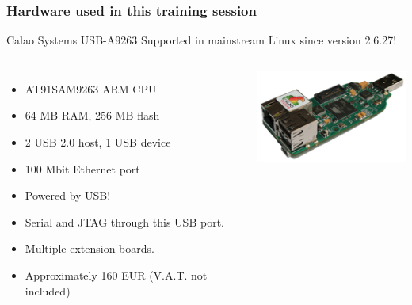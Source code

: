 \begin{frame}
\frametitle{Hardware used in this training session}
  Calao Systems USB-A9263
  Supported in mainstream Linux since version 2.6.27!
  \begin{columns}
    \begin{itemize}
      \item AT91SAM9263 ARM CPU
      \item 64 MB RAM, 256 MB flash
      \item 2 USB 2.0 host, 1 USB device
      \item 100 Mbit Ethernet port
      \item Powered by USB!
      \item Serial and JTAG through this USB port.
      \item Multiple extension boards.
      \item Approximately 160 EUR (V.A.T. not included)
    \end{itemize}
    \includegraphics[width=\textwidth]{slides/calao-board/calao-usb9263.png}
  \end{columns}
\end{frame}
